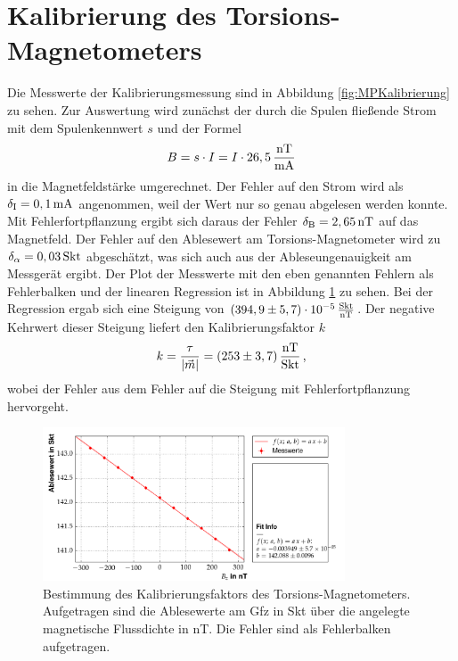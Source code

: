 \section{Kalibrierung des Torsions-Magnetometers}
\label{sec:kalibrierung}

Die Messwerte der Kalibrierungsmessung sind in Abbildung \ref{fig:MPKalibrierung} zu sehen. Zur Auswertung wird zunächst der durch die Spulen fließende Strom mit dem Spulenkennwert $s$ und der Formel
\begin{equation}
 B=s\cdot I=I\cdot 26,5\,\frac{\mathrm{nT}}{\mathrm{mA}} 
\end{equation}
in die Magnetfeldstärke umgerechnet. Der Fehler auf den Strom wird als $\delta_{\mathrm{I}}=0,1\,\mathrm{mA}$ angenommen, weil der Wert nur so genau abgelesen werden konnte. Mit Fehlerfortpflanzung ergibt sich daraus der Fehler $\delta_{\mathrm{B}}=2,65\,\mathrm{nT}$ auf das Magnetfeld. Der Fehler auf den Ablesewert am Torsions-Magnetometer wird zu $\delta_{\mathrm{\alpha}}=0,03\,\mathrm{Skt}$ abgeschätzt, was sich auch aus der Ableseungenauigkeit am Messgerät ergibt. Der Plot der Messwerte mit den eben genannten Fehlern als Fehlerbalken und der linearen Regression ist in Abbildung \ref{fig:kalibrierung} zu sehen. Bei der Regression ergab sich eine Steigung von $(394,9\pm5,7)\cdot 10^{-5}\,\frac{\mathrm{Skt}}{\mathrm{nT}}$. Der negative Kehrwert dieser Steigung liefert den Kalibrierungsfaktor $k$
\begin{equation}
 k=\frac{\tau}{|\vec{m}|}=(253\pm3,7)\,\frac{\mathrm{nT}}{\mathrm{Skt}} \text{\,,}
\end{equation}
wobei der Fehler aus dem Fehler auf die Steigung mit Fehlerfortpflanzung hervorgeht.

\begin{figure}[!ht]
 \centering
 \includegraphics[width=0.8\textwidth]{fig/kalibrierung.png}
 \caption[Bestimmung des Kalibrierungsfaktors des Torsions-Magnetometers]{Bestimmung des Kalibrierungsfaktors des Torsions-Magnetometers. Aufgetragen sind die Ablesewerte am Gfz in Skt über die angelegte magnetische Flussdichte in nT. Die Fehler sind als Fehlerbalken aufgetragen.}
 \label{fig:kalibrierung}
\end{figure}

